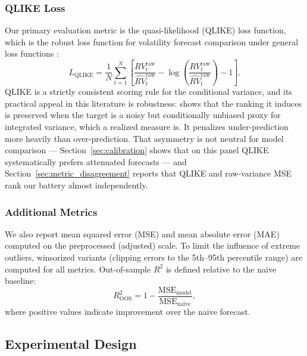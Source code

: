 \subsubsection{QLIKE Loss}
\label{sec:qlike}

Our primary evaluation metric is the quasi-likelihood (QLIKE) loss function, which is the robust loss function for volatility forecast comparison under general loss functions \citep{Patton2011}:
\begin{equation}
    L_{\mathrm{QLIKE}} = \frac{1}{N}\sum_{t=1}^{N} \left[ \frac{RV_t^{\mathrm{raw}}}{\widehat{RV}_t^{\mathrm{raw}}} - \log\!\left(\frac{RV_t^{\mathrm{raw}}}{\widehat{RV}_t^{\mathrm{raw}}}\right) - 1 \right].
    \label{eq:qlike}
\end{equation}
QLIKE is a strictly consistent scoring rule for the conditional variance, and
its practical appeal in this literature is robustness: \citet{Patton2011} shows
that the ranking it induces is preserved when the target is a noisy but
conditionally unbiased proxy for integrated variance, which a realized measure
is. It penalizes under-prediction more heavily than over-prediction. That
asymmetry is not neutral for model comparison --- Section~\ref{sec:calibration}
shows that on this panel QLIKE systematically prefers attenuated forecasts ---
and Section~\ref{sec:metric_disagreement} reports that QLIKE and raw-variance
MSE rank our battery almost independently.

\subsubsection{Additional Metrics}
\label{sec:additional_metrics}

We also report mean squared error (MSE) and mean absolute error (MAE) computed on the preprocessed (adjusted) scale. To limit the influence of extreme outliers, winsorized variants (clipping errors to the 5th--95th percentile range) are computed for all metrics. Out-of-sample $R^2$ is defined relative to the naive baseline:
\begin{equation}
    R^2_{\mathrm{OOS}} = 1 - \frac{\mathrm{MSE}_{\mathrm{model}}}{\mathrm{MSE}_{\mathrm{naive}}},
    \label{eq:oos_r2}
\end{equation}
where positive values indicate improvement over the naive forecast.

\subsection{Experimental Design}
\label{sec:experimental_design}

